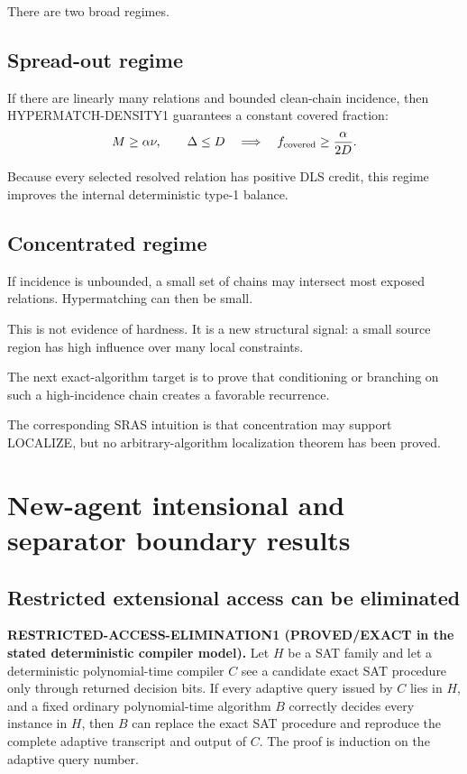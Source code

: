 \documentclass[11pt]{article}
\theoremstyle{plain}
\theoremstyle{definition}
\theoremstyle{remark}
\begin{document}
There are two broad regimes.

\subsection{Spread-out regime}

If there are linearly many relations and bounded clean-chain incidence, then
HYPERMATCH-DENSITY1 guarantees a constant covered fraction:
\[
M\ge\alpha\nu,\qquad
\Delta\le D
\quad\Longrightarrow\quad
f_{\rm covered}\ge\frac{\alpha}{2D}.
\]

Because every selected resolved relation has positive DLS credit, this regime
improves the internal deterministic type-1 balance.

\subsection{Concentrated regime}

If incidence is unbounded, a small set of chains may intersect most exposed
relations. Hypermatching can then be small.

This is not evidence of hardness. It is a new structural signal:
a small source region has high influence over many local constraints.

The next exact-algorithm target is to prove that conditioning or branching on
such a high-incidence chain creates a favorable recurrence.

The corresponding SRAS intuition is that concentration may support LOCALIZE,
but no arbitrary-algorithm localization theorem has been proved.


\section{New-agent intensional and separator boundary results}

\subsection{Restricted extensional access can be eliminated}

\textbf{RESTRICTED-ACCESS-ELIMINATION1 (PROVED/EXACT in the stated deterministic compiler model).}
Let \(H\) be a SAT family and let a deterministic polynomial-time compiler
\(C\) see a candidate exact SAT procedure only through returned decision bits.
If every adaptive query issued by \(C\) lies in \(H\), and a fixed ordinary
polynomial-time algorithm \(B\) correctly decides every instance in \(H\),
then \(B\) can replace the exact SAT procedure and reproduce the complete
adaptive transcript and output of \(C\).  The proof is induction on the
adaptive query number.
\end{document}
